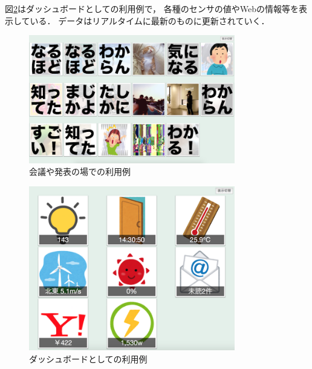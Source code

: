 図\ref{sensors}はダッシュボードとしての利用例で，
各種のセンサの値やWebの情報等を表示している．
データはリアルタイムに最新のものに更新されていく．

\begin{figure}[h]
\centering
\includegraphics[width=9cm]{images/discussion.png}
\caption{会議や発表の場での利用例}
\label{discussion}
\end{figure}

\begin{figure}[h]
\centering
\includegraphics[width=9cm]{images/sensors.png}
\caption{ダッシュボードとしての利用例}
\label{sensors}
\end{figure}